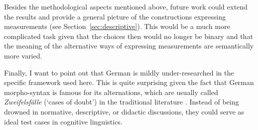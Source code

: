 




Besides the methodological aspects mentioned above, future work could extend the results and provide a general picture of the constructions expressing measurements (see Section~\ref{sec:descriptive}).
This would be a much more complicated task given that the choices then would no longer be binary and that the meaning of the alternative ways of expressing measurements are semantically more varied.


Finally, I want to point out that German is mildly under-researched in the specific framework used here.
This is quite surprising given the fact that German morpho-syntax is famous for its alternations, which are usually called \textit{Zweifelsfälle} (`cases of doubt') in the traditional literature \citep{Duden09,Klein2009}.
Instead of being drowned in normative, descriptive, or didactic discussions, they could serve as ideal test cases in cognitive linguistics.

